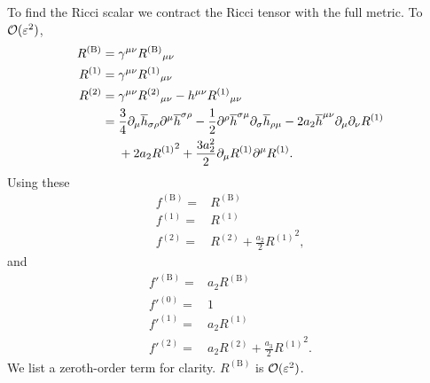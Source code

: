 To find the Ricci scalar we contract the Ricci tensor with the full metric. To $\mathcal{O}({\varepsilon^2})$,
\begin{align}
R^{(\text{B})} = {} & \gamma^{\mu\nu} {R^{(\text{B})}}_{\mu\nu} \\
R^{(1)} = {} & \gamma^{\mu\nu} {R^{(1)}}_{\mu\nu} \\
R^{(2)} = {} & \gamma^{\mu\nu} {R^{(2)}}_{\mu\nu} - h^{\mu\nu} {R^{(1)}}_{\mu\nu} \nonumber \\*
 = {} & \frac{3}{4}\partial_\mu\overline{h}_{\sigma\rho}\partial^\mu\overline{h}^{\sigma\rho} - \frac{1}{2} \partial^\rho\overline{h}^{\sigma\mu}\partial_\sigma\overline{h}_{\rho\mu} - 2a_2 \overline{h}^{\mu\nu}\partial_\mu\partial_\nu R^{(1)} \nonumber \\*
  & + {} 2 a_2 {R^{(1)}}^2 + \frac{3a_2^2}{2}\partial_\mu R^{(1)} \partial^\mu R^{(1)}.
\end{align}
Using these
\begin{align}
f^{(\text{B})} = {} & R^{(\text{B})} \\
f^{(1)} = {} & R^{(1)} \\
f^{(2)} = {} & R^{(2)} + \frac{a_2}{2}{R^{(1)}}^2,
\end{align}
and
\begin{align}
f'^{(\text{B})} = {} & a_2 R^{(\text{B})} \\
f'^{(0)} = {} & 1 \\
f'^{(1)} = {} & a_2 R^{(1)} \\
f'^{(2)} = {} & a_2 R^{(2)} + \frac{a_3}{2}{R^{(1)}}^2.
\end{align}
We list a zeroth-order term for clarity. $R^{(\text{B})}$ is $\mathcal{O}({\varepsilon^2})$.

